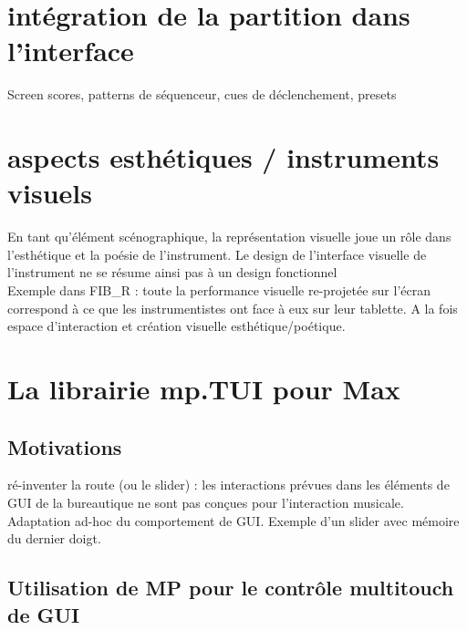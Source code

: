\section{intégration de la partition dans l'interface}
Screen scores, patterns de séquenceur, cues de déclenchement, presets

\section{aspects esthétiques / instruments visuels}
En tant qu'élément scénographique, la représentation visuelle joue un rôle dans l'esthétique et la poésie de l'instrument. Le design de l'interface visuelle de l'instrument ne se résume ainsi pas à un design fonctionnel\\

Exemple dans FIB\_R : toute la performance visuelle re-projetée sur l'écran correspond à ce que les instrumentistes ont face à eux sur leur tablette. A la fois espace d'interaction et création visuelle esthétique/poétique.



\section{La librairie mp.TUI pour Max}

\subsection{Motivations}

ré-inventer la route (ou le slider) : les interactions prévues dans les éléments de GUI de la bureautique ne sont pas conçues pour l'interaction musicale. Adaptation ad-hoc du comportement de GUI. Exemple d'un slider avec mémoire du dernier doigt. 


\subsection{Utilisation de MP pour le contrôle multitouch de GUI}

